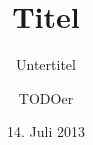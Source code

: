 \begin{singlespace}
	\titlehead{{\Large Institut~kurz
	\hfill SoSe~2013\\}
	Institut~lang\\
	Musterstr.~6\\
	99999 Mustertown}
	\subject{Thema}
	\title{Titel}
	\subtitle{Untertitel}
	\author{TODOer}
	\date{14. Juli 2013}
	\publishers{Betreut durch}
\end{singlespace}
